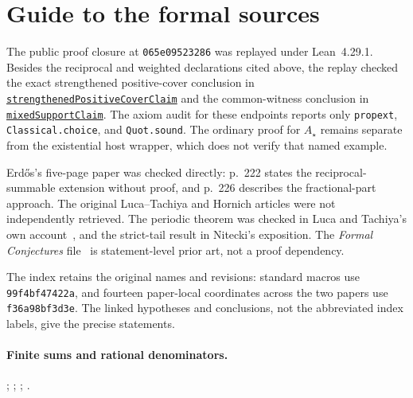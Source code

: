 \documentclass[11pt]{article}
\renewcommand{\commitshort}{99f4bf47422a}
\begin{document}
\appendix
\section{Guide to the formal sources}\label{app:sources}

The public proof closure at \texttt{065e09523286} was replayed under
Lean~4.29.1.  Besides the reciprocal and weighted declarations cited above,
the replay checked the exact strengthened positive-cover conclusion in
\href{https://github.com/wcook04/plectis-erdos/blob/065e09523286894dfb57ba205e69666843817009/lean/ErdosProblems/Erdos257/PaperCompleteR8/PositiveCoverReturn.lean#L241}{\texttt{strengthenedPositiveCoverClaim}}
and the common-witness conclusion in
\href{https://github.com/wcook04/plectis-erdos/blob/065e09523286894dfb57ba205e69666843817009/lean/ErdosProblems/Erdos257/PaperCompleteR8/WeightedReturn.lean#L105}{\texttt{mixedSupportClaim}}.
The axiom audit for these endpoints reports only \texttt{propext},
\texttt{Classical.choice}, and \texttt{Quot.sound}.  The ordinary proof for
$A_\star$ remains separate from the existential host wrapper, which does not
verify that named example.

Erd\H{o}s's five-page paper was checked directly: p.~222 states the
reciprocal-summable extension without proof, and p.~226 describes the
fractional-part approach.  The original Luca--Tachiya and Hornich articles
were not independently retrieved.  The periodic theorem
\cite{lucatachiya2014periodic} was checked in Luca and Tachiya's own
account~\cite[Theorem~A and Example~2, pp.~139--140]{lucatachiya2017},
and the strict-tail result in Nitecki's exposition.  The \emph{Formal Conjectures}
file~\cite{formalconjectures257} is statement-level prior art, not a
proof dependency.

The index retains the original names and revisions: standard macros use
\texttt{\commitshort}, and fourteen paper-local coordinates across the two
papers use \texttt{f36a98bf3d3e}.  The linked hypotheses and conclusions,
not the abbreviated index labels, give the precise statements.

\paragraph{Finite sums and rational denominators.}
;
;
;
.
\end{document}
